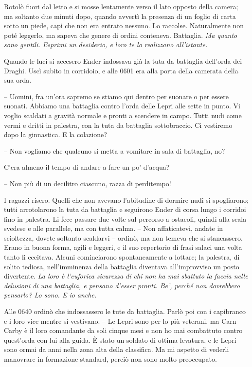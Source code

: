 {Rotolò fuori dal letto e si mosse lentamente verso il lato opposto
	della camera; ma soltanto due minuti dopo, quando avvertì la presenza di
	un foglio di carta sotto un piede, capì che non era entrato nessuno. Lo
	raccolse. Naturalmente non poté leggerlo, ma sapeva che genere di ordini
	conteneva. Battaglia. \emph{Ma quanto sono gentili. Esprimi un
		desiderio, e loro te lo realizzano all'istante.}}

{Quando le luci si accesero Ender indossava già la tuta da battaglia
	dell'orda dei Draghi. Uscì subito in corridoio, e alle 0601 era alla
	porta della camerata della sua orda.}

{-- Uomini, fra un'ora sapremo se stiamo qui dentro per suonare o per
	essere suonati. Abbiamo una battaglia contro l'orda delle Lepri alle
	sette in punto. Vi voglio scaldati a gravità normale e pronti a scendere
	in campo. Tutti nudi come vermi e dritti in palestra, con la tuta da
	battaglia sottobraccio. Ci vestiremo dopo la ginnastica. E la
	colazione?}

{-- Non vogliamo che qualcuno si metta a vomitare in sala di battaglia,
	no?}

{C'era almeno il tempo di andare a fare un po' d'acqua?}

{-- Non più di un decilitro ciascuno, razza di perditempo!}

{I ragazzi risero. Quelli che non avevano l'abitudine di dormire nudi si
	spogliarono; tutti arrotolarono la tuta da battaglia e seguirono Ender
	di corsa lungo i corridoi fino in palestra. Li fece passare due volte
	sul percorso a ostacoli, quindi alla scala svedese e alle parallele, ma
	con tutta calma. -- Non affaticatevi, andate in scioltezza, dovete
	soltanto scaldarvi -- ordinò, ma non temeva che si stancassero. Erano in
	buona forma, agili e leggeri, e il suo repertorio di frasi salaci una
	volta tanto li eccitava. Alcuni cominciarono spontaneamente a lottare;
	la palestra, di solito tediosa, nell'imminenza della battaglia diventava
	all'improvviso un posto divertente. \emph{La loro è l'euforica sicurezza
		di chi non ha mai sbattuto la faccia nelle delusioni di una battaglia, e
		pensano d'esser pronti. Be', perché non dovrebbero pensarlo? Lo sono. E
		io anche.}}

{Alle 0640 ordinò che indossassero le tute da battaglia. Parlò poi con i
	capibranco e i loro vice mentre si vestivano. -- Le Lepri sono per lo
	più veterani, ma Carn Carby è il loro comandante da soli cinque mesi e
	non ho mai combattuto contro quest'orda con lui alla guida. È stato un
	soldato di ottima levatura, e le Lepri sono ormai da anni nella zona
	alta della classifica. Ma mi aspetto di vederli manovrare in formazione
	standard, perciò non sono molto preoccupato.}

